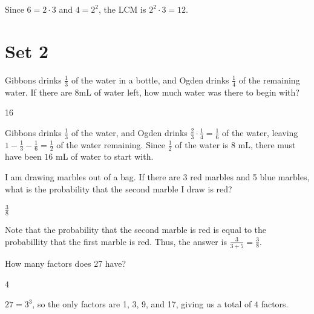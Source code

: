 \documentclass[11pt]{article}
\begin{document}
\begin{solution}
Since $6=2\cdot 3$ and $4=2^2$, the LCM is $2^2 \cdot 3=\boxed{12}$.
\end{solution}

\newpage
\section*{Set 2}
\begin{problem}
Gibbons drinks $\frac{1}{3}$ of the water in a bottle, and Ogden drinks $\frac{1}{4}$ of the remaining water. If there are 8mL of water left, how much water was there to begin with?
\end{problem}

\begin{answer}
16
\end{answer}

\begin{solution}
Gibbons drinks $\frac{1}{3}$ of the water, and Ogden drinks $\frac{2}{3} \cdot \frac{1}{4} = \frac{1}{6}$ of the water, leaving $1-\frac{1}{3} - \frac{1}{6} = \frac{1}{2}$ of the water remaining. Since $\frac{1}{2}$ of the water is 8 mL, there must have been $\boxed{16}$ mL of water to start with.
\end{solution}

\begin{problem}
I am drawing marbles out of a bag. If there are 3 red marbles and 5 blue marbles, what is the probability that the second marble I draw is red?
\end{problem}

\begin{answer}
$\frac{3}{8}$
\end{answer}

\begin{solution}
Note that the probability that the second marble is red is equal to the probabillity that the first marble is red. Thus, the answer is $\frac{3}{3+5} = \boxed{\frac{3}{8}}$.
\end{solution}

\begin{problem}
How many factors does 27 have?
\end{problem}

\begin{answer}
4
\end{answer}

\begin{solution}
$27 = 3^3$, so the only factors are 1, 3, 9, and 17, giving us a total of $\boxed{4}$ factors.
\end{solution}
\end{document}
